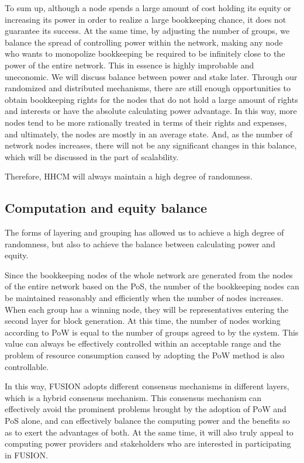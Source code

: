 \documentclass[a4paper,12pt]{article}
\begin{document}
To sum up, although a node spends a large amount of cost holding its equity or increasing its power in order to realize a large bookkeeping chance, it does not guarantee its success. At the same time, by adjusting the number of groups, we balance the spread of controlling power within the network, making any node who wants to monopolize bookkeeping be required to be infinitely close to the power of the entire network. This in essence is highly improbable and uneconomic. We will discuss balance between power and stake later. Through our randomized and distributed mechanisms, there are still enough opportunities to obtain bookkeeping rights for the nodes that do not hold a large amount of rights and interests or have the absolute calculating power advantage. In this way, more nodes tend to be more rationally treated in terms of their rights and expenses, and ultimately, the nodes are mostly in an average state. And, as the number of network nodes increases, there will not be any significant changes in this balance, which will be discussed in the part of scalability.

Therefore, HHCM will always maintain a high degree of randomness.

\subsection {Computation and equity balance}

The forms of layering and grouping has allowed us to achieve a high degree of randomness, but also to achieve the balance between calculating power and equity.

Since the bookkeeping nodes of the whole network are generated from the nodes of the entire network based on the PoS, the number of the bookkeeping nodes can be maintained reasonably and efficiently when the number of nodes increases. When each group has a winning node, they will be representatives entering the second layer for block generation. At this time, the number of nodes working according to PoW is equal to the number of groups agreed to by the system. This value can always be effectively controlled within an acceptable range and the problem of resource consumption caused by adopting the PoW method is also controllable.

In this way, FUSION adopts different consensus mechanisms in different layers, which is a hybrid consensus mechanism. This consensus mechanism can effectively avoid the prominent problems brought by the adoption of PoW and PoS alone, and can effectively balance the computing power and the benefits so as to exert the advantages of both. At the same time, it will also truly appeal to computing power providers and stakeholders who are interested in participating in FUSION.
\end{document}

